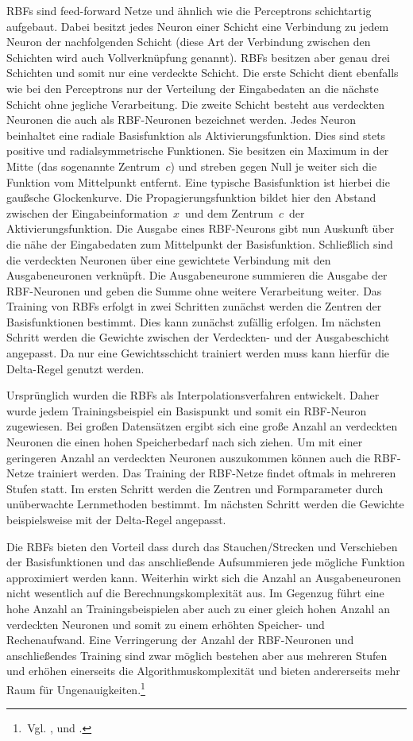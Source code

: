 RBFs sind feed-forward Netze und ähnlich wie die Perceptrons schichtartig aufgebaut. Dabei besitzt jedes Neuron einer Schicht eine Verbindung zu jedem Neuron der nachfolgenden Schicht (diese Art der Verbindung zwischen den Schichten wird auch Vollverknüpfung genannt). RBFs besitzen aber genau drei Schichten und somit nur eine verdeckte Schicht. Die erste Schicht dient ebenfalls wie bei den Perceptrons nur der Verteilung der Eingabedaten an die nächste Schicht ohne jegliche Verarbeitung. Die zweite Schicht besteht aus verdeckten Neuronen die auch als RBF-Neuronen  bezeichnet werden. Jedes Neuron beinhaltet eine radiale Basisfunktion als Aktivierungsfunktion. Dies sind stets positive und radialsymmetrische Funktionen. Sie besitzen ein Maximum in der Mitte (das sogenannte Zentrum~$c$) und streben gegen Null je weiter sich die Funktion vom Mittelpunkt entfernt. Eine typische Basisfunktion ist hierbei die gaußsche Glockenkurve. Die Propagierungsfunktion bildet hier den Abstand zwischen der Eingabeinformation~$x$~und dem Zentrum~$c$~der Aktivierungsfunktion. Die Ausgabe eines RBF-Neurons gibt nun Auskunft über die nähe der Eingabedaten zum Mittelpunkt der Basisfunktion. Schließlich sind die verdeckten Neuronen über eine gewichtete Verbindung mit den Ausgabeneuronen  verknüpft. Die Ausgabeneurone summieren die Ausgabe der RBF-Neuronen und geben die Summe ohne weitere Verarbeitung weiter. Das Training von RBFs erfolgt in zwei Schritten zunächst werden die Zentren der Basisfunktionen bestimmt. Dies kann zunächst zufällig erfolgen. Im nächsten Schritt werden die Gewichte zwischen der Verdeckten- und der Ausgabeschicht angepasst. Da nur eine Gewichtsschicht trainiert werden muss kann hierfür die Delta-Regel genutzt werden.

Ursprünglich wurden die RBFs als Interpolationsverfahren entwickelt. Daher wurde jedem Trainingsbeispiel ein Basispunkt und somit ein RBF-Neuron zugewiesen. Bei großen Datensätzen ergibt sich eine große Anzahl an verdeckten Neuronen die einen hohen Speicherbedarf nach sich ziehen. Um mit einer geringeren Anzahl an verdeckten Neuronen auszukommen können auch die RBF-Netze trainiert werden. Das Training der RBF-Netze findet oftmals in mehreren Stufen statt. Im ersten Schritt werden die Zentren und Formparameter durch unüberwachte Lernmethoden bestimmt. Im nächsten Schritt werden die Gewichte beispielsweise mit der Delta-Regel angepasst.

Die RBFs bieten den Vorteil dass durch das Stauchen/Strecken und Verschieben der Basisfunktionen und das anschließende Aufsummieren jede mögliche Funktion approximiert werden kann. Weiterhin wirkt sich die Anzahl an Ausgabeneuronen nicht wesentlich auf die Berechnungskomplexität aus. Im Gegenzug führt eine hohe Anzahl an Trainingsbeispielen aber auch zu einer gleich hohen Anzahl an verdeckten Neuronen und somit zu einem erhöhten Speicher- und Rechenaufwand. Eine Verringerung der Anzahl der RBF-Neuronen und anschließendes Training sind zwar möglich bestehen aber aus mehreren Stufen und erhöhen einerseits die Algorithmuskomplexität und bieten andererseits mehr Raum für Ungenauigkeiten.\footnote{\,Vgl. \citet[73 ff]{comp_int_07}, \citet[109 ff]{dkriesel07} und \citet[261 ff]{Kroll16}.}



